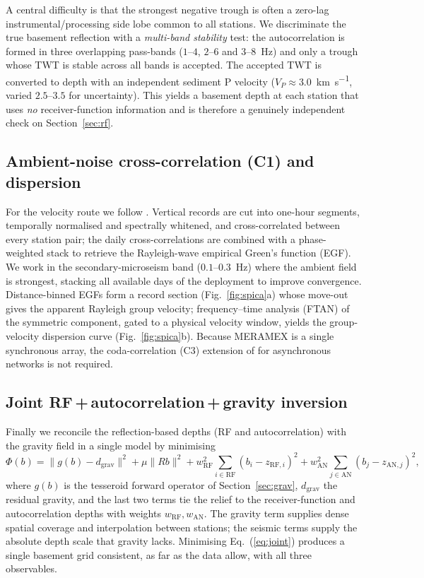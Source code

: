 A central difficulty is that the strongest negative trough is often a zero-lag
instrumental/processing side lobe common to all stations. We discriminate the
true basement reflection with a \emph{multi-band stability} test: the
autocorrelation is formed in three overlapping pass-bands ($1$--$4$, $2$--$6$ and
$3$--$8$~\si{\hertz}) and only a trough whose TWT is stable across all bands is
accepted. The accepted TWT is converted to depth with an independent sediment P
velocity ($V_P\approx3.0$~\si{\km\per\s}, varied $2.5$--$3.5$ for uncertainty).
This yields a basement depth at each station that uses \emph{no} receiver-function
information and is therefore a genuinely independent check on
Section~\ref{sec:rf}.

\subsection{Ambient-noise cross-correlation (C1) and dispersion}\label{sec:c1}
For the velocity route we follow \citet{Spica2016}. Vertical records are cut into
one-hour segments, temporally normalised and spectrally whitened, and
cross-correlated between every station pair; the daily cross-correlations are
combined with a phase-weighted stack \citep{SchimmelPaulssen1997} to retrieve the
Rayleigh-wave empirical Green's function (EGF). We work in the secondary-microseism
band ($0.1$--$0.3$~\si{\hertz}) where the ambient field is strongest, stacking all
available days of the deployment to improve convergence. Distance-binned EGFs
form a record section (Fig.~\ref{fig:spica}a) whose move-out gives the apparent
Rayleigh group velocity; frequency--time analysis (FTAN) of the symmetric
component, gated to a physical velocity window, yields the group-velocity
dispersion curve (Fig.~\ref{fig:spica}b). Because MERAMEX is a single synchronous
array, the coda-correlation (C3) extension of \citet{Spica2016} for asynchronous
networks is not required.

\subsection{Joint RF\,+\,autocorrelation\,+\,gravity inversion}\label{sec:joint}
Finally we reconcile the reflection-based depths (RF and autocorrelation) with the
gravity field in a single model by minimising
\begin{equation}
\Phi(b)=\lVert g(b)-d_{\mathrm{grav}}\rVert^{2}
      +\mu\lVert Rb\rVert^{2}
      +w_{\mathrm{RF}}^{2}\!\!\sum_{i\in\mathrm{RF}}\!(b_i-z_{\mathrm{RF},i})^{2}
      +w_{\mathrm{AN}}^{2}\!\!\sum_{j\in\mathrm{AN}}\!(b_j-z_{\mathrm{AN},j})^{2},
\label{eq:joint}
\end{equation}
where $g(b)$ is the tesseroid forward operator of Section~\ref{sec:grav},
$d_{\mathrm{grav}}$ the residual gravity, and the last two terms tie the relief to
the receiver-function and autocorrelation depths with weights
$w_{\mathrm{RF}}, w_{\mathrm{AN}}$. The gravity term supplies dense spatial
coverage and interpolation between stations; the seismic terms supply the absolute
depth scale that gravity lacks. Minimising Eq.~(\ref{eq:joint}) produces a single
basement grid consistent, as far as the data allow, with all three observables.

